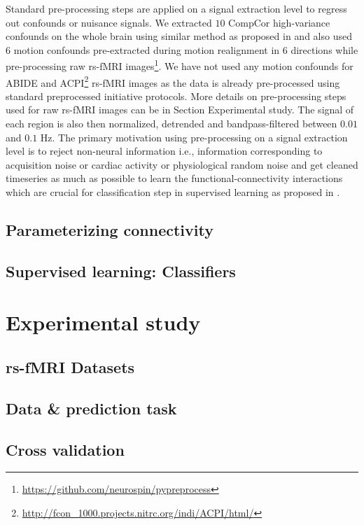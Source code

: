 \documentclass[5p]{elsarticle}
\begin{document}
Standard pre-processing steps are applied on a signal extraction level
to regress out confounds or nuisance signals. We extracted $10$ CompCor
high-variance confounds on the whole brain using similar method as
proposed in \citep{behzadi2007} and also used $6$ motion confounds pre-extracted
during motion realignment in $6$ directions while pre-processing raw rs-fMRI
images\footnote{\url{https://github.com/neurospin/pypreprocess}}.
We have not used any motion
confounds for ABIDE \citep{dimartino2014autism} and
ACPI\footnote{\url{http://fcon_1000.projects.nitrc.org/indi/ACPI/html/}}
rs-fMRI images as the data is already
pre-processed using standard preprocessed initiative protocols.
More details on pre-processing steps used for raw rs-fMRI
images can be in Section Experimental study.
The signal of each region is also
then normalized, detrended and bandpass-filtered between $0.01$
and $0.1$ Hz. The primary motivation using pre-processing on a signal extraction
level is to reject non-neural information i.e., information corresponding to
acquisition noise or cardiac activity or physiological random noise and get
cleaned timeseries as much as possible to learn the functional-connectivity
interactions which are crucial for classification step in supervised learning
as proposed in \citep{varoquaux2013connectomes}.

\subsection{Parameterizing connectivity}

\subsection{Supervised learning: Classifiers}

\section{Experimental study}

\subsection{rs-fMRI Datasets}

\subsection{Data \& prediction task}
\subsection{Cross validation}
\end{document}
